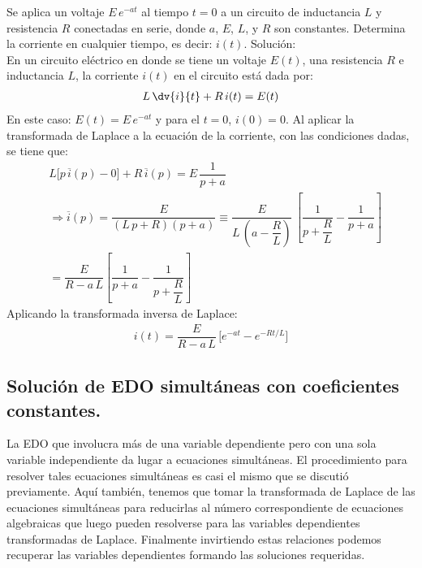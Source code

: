 \begin{ejemplo}
Se aplica un voltaje $E \, e^{- a t}$ al tiempo $t = 0$ a un circuito de inductancia $L$ y resistencia $R$ conectadas en serie, donde $a$, $E$, $L$, y $R$ son constantes. Determina la corriente en cualquier tiempo, es decir: $i(t)$.
\noindent Solución:
\\[0.5em]
En un circuito eléctrico en donde se tiene un voltaje $E(t)$, una resistencia $R$ e inductancia $L$, la corriente $i(t)$ en el circuito está dada por:
\begin{align*}
L \, \dv{i}{t} + R \, i(t) =  E(t)
\end{align*}
En este caso: $E(t) = E \, e^{-a t}$ y para el $t = 0$, $i(0) = 0$. Al aplicar la transformada de Laplace a la ecuación de la corriente, con las condiciones dadas, se tiene que:
\begin{align*}
&L \big[ p \, \overline{i}(p) - 0 \big] + R \, \overline{i} (p) = E \, \dfrac{1}{p + a} \\[0.5em]
&\Rightarrow \overline{i}(p) = \dfrac{E}{(L \, p + R)(p + a)} \equiv \dfrac{E}{L \, \left(a - \dfrac{R}{L} \right)} \, \left[ \dfrac{1}{p + \dfrac{R}{L}}  - \dfrac{1}{p + a}\right] \\[0.5em]
&= \dfrac{E}{R - a \, L} \left[ \dfrac{1}{p + a} - \dfrac{1}{p + \dfrac{R}{L}}\right]
\end{align*}
Aplicando la transformada inversa de Laplace:
\begin{align*}
i(t) = \dfrac{E}{R - a \, L} \, \big[ e^{-a t} - e^{-R t /L}\big]
\end{align*}
\end{ejemplo}

\subsection{Solución de EDO simultáneas con coeficientes constantes.}

La EDO que involucra más de una variable dependiente pero con una sola variable independiente da lugar a ecuaciones simultáneas. El procedimiento para resolver tales ecuaciones simultáneas es casi el mismo que se discutió previamente. Aquí también, tenemos que tomar la transformada de Laplace de las ecuaciones simultáneas para reducirlas al número correspondiente de ecuaciones algebraicas que luego pueden resolverse para las variables dependientes transformadas de Laplace. Finalmente invirtiendo estas relaciones podemos recuperar las variables dependientes formando las soluciones requeridas.

